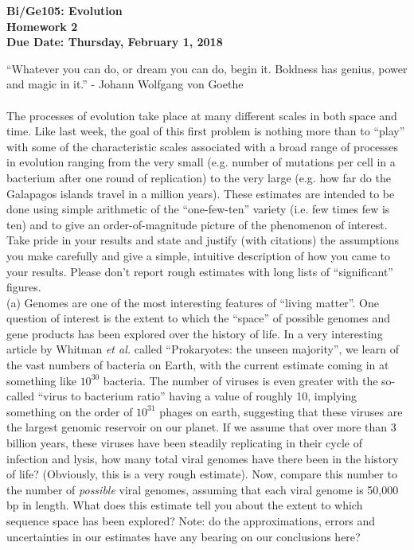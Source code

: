 \documentclass[12pt]{article}    %
\begin{document}
\relax


\begin{center}
{\bf\Large Bi/Ge105: Evolution}\\
{\bf\Large Homework 2}\\
{\bf\Large Due Date: Thursday, February 1, 2018}\\
\end{center}
 
``Whatever you can do, or dream you can do, begin it.  Boldness has genius, power
and magic in it.''  - Johann Wolfgang von Goethe\\


\\

\noindent The processes of evolution take place at many different scales in
both space and time.  Like last week, the goal of this first problem is nothing more than to ``play''
with some of the characteristic scales associated with a broad range of processes in
evolution ranging from the very small (e.g. number of mutations per cell in a bacterium
after one round of replication) to the very large (e.g. how far do the Galapagos islands travel
in a million years).  These estimates are intended to be done using simple arithmetic of
the ``one-few-ten'' variety (i.e. few times few is ten) and to give an order-of-magnitude 
picture of the phenomenon of interest.  Take pride in  your results and state and
justify (with citations) the assumptions you make carefully and give a simple, intuitive description of how you came
to your results.   Please don't report
rough estimates with long lists of ``significant'' figures.  \\



(a) Genomes are one of the most interesting features of ``living matter''.   One question of interest is the extent to which the ``space'' of possible genomes and gene products has been explored over the history of life.  In a very interesting article by Whitman {\it et al.} called
``Prokaryotes: the unseen majority'', we learn of the vast numbers of bacteria on Earth, with the current estimate coming in at something like $10^{30}$ bacteria.  The number of
viruses is even greater with the so-called ``virus to bacterium ratio'' having a value of roughly 10, implying something on the order of $10^{31}$ phages on earth, suggesting that these viruses are the largest genomic reservoir on our planet.  If we assume that over
more than 3 billion years, these viruses have been steadily replicating in their cycle of infection and lysis, how many total viral genomes have there been in the history of life?  (Obviously, this is a very rough estimate).  Now, compare this number to the number of {\it possible} viral genomes, assuming that each viral genome is 50,000 bp in length.  What
does this estimate tell you about the extent to which sequence space has been explored?
Note: do the approximations, errors and uncertainties in our estimates have any bearing on
our conclusions here?\\
\end{document}
